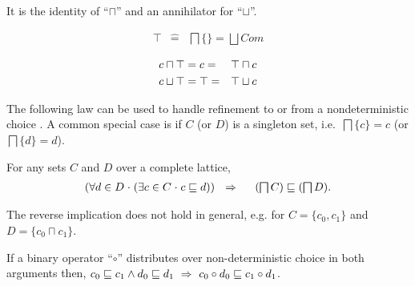 \documentclass[fleqn]{fac}
\newcommand{\labelproperty}[1]{\label{property-#1}\index{Property!#1|PropertyDef{\ref{property-#1}}}}
\newcommand{\sdefs}{\mathrel{\widehat=}}\newcommand{\spot}{\mathrel{{\cdot}}}\newcommand{\where}{\mathrel{|}}\renewcommand{\implies}{\mathrel{\Rightarrow}}\newcommand{\emptyrel}{\emptyset}
\newcommand{\Command}{\mathit{Com}}
\newcommand{\nondet}{\mathbin{\sqcap}}
\newcommand{\Nondet}{\mathop{\textstyle\bigsqcap}}
\newcommand{\angelic}{\mathbin{\sqcup}}
\newcommand{\Angelic}{\mathop{\textstyle\bigsqcup}}
\newcommand{\Keyword}[1]{\mathsf{\mathbf{#1}}}
\newcommand{\Magic}{\Keyword{\top}}
\begin{document}
\begin{itemize}
It is the identity of ``$\nondet$'' and an annihilator for ``$\angelic$''. \\[-1ex]
\begin{minipage}{0.48\textwidth}
\begin{eqnarray}
  \Magic & \sdefs & \Nondet \{\} = \Angelic \Command
\end{eqnarray}
\end{minipage}
\begin{minipage}{0.48\textwidth}
\begin{eqnarray}
  c \nondet \Magic & =  c  = & \Magic \nondet c  \labelproperty{nondet-identity} \\
  c \angelic \Magic & = \Magic  = & \Magic \angelic c  \labelproperty{supremum-magic-zero} 
\end{eqnarray}
\end{minipage}
\end{itemize}
The following law can be used to handle refinement to or from a nondeterministic choice \cite{BackWright98}.
A common special case is if $C$ (or $D$) is a singleton set,
i.e.\ $\Nondet \{c\} = c$ (or $\Nondet \{d\} = d$). 
\begin{lemmax}
For any sets $C$ and $D$ over a complete lattice,
\begin{eqnarray*}
  (\forall d \in D \spot (\exists c \in C \spot c \refsto d)) & ~~\implies~~ & (\Nondet C) \refsto (\Nondet D).
\end{eqnarray*}
\end{lemmax}
The reverse implication does not hold in general, e.g. for $C = \{c_0,c_1\}$ and $D = \{c_0 \nondet c_1\}$.

\begin{lemmax}
If a binary operator ``$\circ$'' distributes over non-deterministic choice in both arguments then,
$c_0 \refsto c_1 \land d_0 \refsto d_1 ~\implies~ c_0 \circ d_0 \refsto c_1 \circ d_1$.
\end{lemmax}
\end{document}
